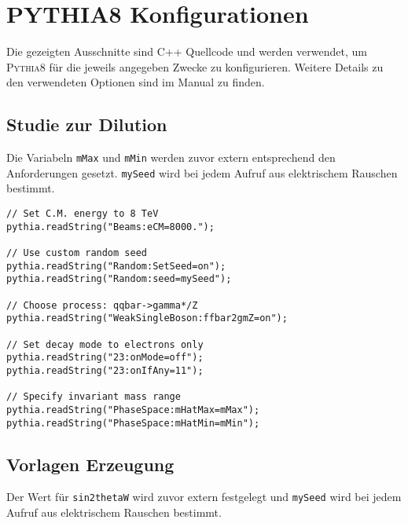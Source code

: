 


\chapter{\textsc{PYTHIA8} Konfigurationen}

Die gezeigten Ausschnitte sind C++ Quellcode und werden verwendet, um
\textsc{Pythia8} für die jeweils angegeben Zwecke zu konfigurieren. Weitere
Details zu den verwendeten Optionen sind im Manual zu finden.



\section{Studie zur Dilution}
\label{pythia8:dilution}
Die Variabeln \texttt{mMax} und \texttt{mMin} werden zuvor extern entsprechend
den Anforderungen gesetzt. \texttt{mySeed} wird bei jedem Aufruf aus
elektrischem Rauschen bestimmt.

\lstset{language=C++}
\begin{small}
\begin{lstlisting}[frame=single]
// Set C.M. energy to 8 TeV
pythia.readString("Beams:eCM=8000.");

// Use custom random seed
pythia.readString("Random:SetSeed=on");
pythia.readString("Random:seed=mySeed");

// Choose process: qqbar->gamma*/Z
pythia.readString("WeakSingleBoson:ffbar2gmZ=on");

// Set decay mode to electrons only
pythia.readString("23:onMode=off");
pythia.readString("23:onIfAny=11");

// Specify invariant mass range
pythia.readString("PhaseSpace:mHatMax=mMax");
pythia.readString("PhaseSpace:mHatMin=mMin");
\end{lstlisting}
\end{small}



\section{Vorlagen Erzeugung}
\label{pythia8:templates}
Der Wert für \texttt{sin2thetaW} wird zuvor extern festgelegt und
\texttt{mySeed} wird bei jedem Aufruf aus elektrischem Rauschen bestimmt.


